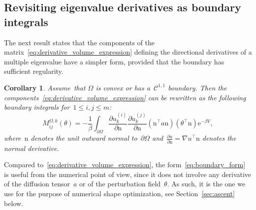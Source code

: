 \documentclass[a4]{article}
\newcommand{\e}{\mathrm{e}}
\newcommand{\n}{\mathrm{n}}
\newcommand{\1}{\mathbbm 1}
\newtheorem{corollary}{Corollary}
\begin{document}
\subsection{Revisiting eigenvalue derivatives as boundary integrals}
\label{subsec:boundary_form}
The next result states that the components of the matrix~\eqref{eq:derivative_volume_expression} defining the directional derivatives of a multiple eigenvalue have a simpler form, provided that the boundary has sufficient regularity.
\begin{corollary}
    \label{cor:boundary_expression}
    Assume~that $\Omega$ is convex or has a~$\mathcal C^{1,1}$ boundary.
    Then the components~\eqref{eq:derivative_volume_expression} can be rewritten as the following boundary integrals for~$1\leq i,j\leq m$:  
    \begin{equation}
        \label{eq:boundary_form}
        M^{\Omega,k}_{ij}(\theta) = -\frac1\beta\int_{\partial\Omega} \frac{\partial u_k^{(i)}}{\partial\n}\frac{\partial u_k^{(j)}}{\partial\n}\left(\n^\top a \n\right) \left(\theta^\top\n\right)\e^{-\beta V},
    \end{equation}
    where~$\n$ denotes the unit outward normal to~$\partial\Omega$ and~$\frac{\partial u}{\partial \n} =\nabla u^\top\n$ denotes the normal derivative.
\end{corollary}
Compared to~\eqref{eq:derivative_volume_expression}, the form~\eqref{eq:boundary_form} is useful from the numerical point of view, since it does not involve any derivative of the diffusion tensor~$a$ or of the perturbation field~$\theta$. As such, it is the one we use for the purpose of numerical shape optimization, see Section~\ref{sec:ascent} below.
\end{document}
